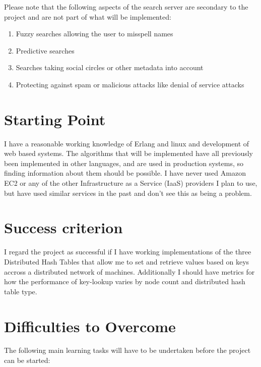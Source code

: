 Please note that the following aspects of the search server are secondary to the project and are not part of what will be implemented:

\begin{enumerate}
  \item Fuzzy searches allowing the user to misspell names
  \item Predictive searches
  \item Searches taking social circles or other metadata into account
  \item Protecting against spam or malicious attacks like denial of service attacks
\end{enumerate}


\section*{Starting Point}

I have a reasonable working knowledge of Erlang and linux and development of web based systems. The algorithms that will be implemented have all previously been implemented in other languages, and are used in production systems, so finding information about them should be possible. I have never used Amazon EC2 or any of the other Infrastructure as a Service (IaaS) providers I plan to use, but have used similar services in the past and don't see this as being a problem.


\section*{Success criterion}

I regard the project as successful if I have working implementations of the three Distributed Hash Tables that allow me to set and retrieve values based on keys accross a distributed network of machines. Additionally I should have metrics for how the performance of key-lookup varies by node count and distributed hash table type.

\section*{Difficulties to Overcome}

The following main learning tasks will have to be undertaken before 
the project can be started:

